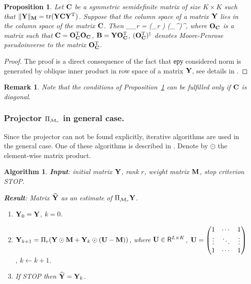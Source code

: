\documentclass[sii]{ipart}
\DeclareMathOperator{\tr}{tr}
\newtheorem{proposition}{Proposition}
\newtheorem{algorithm}{Algorithm}
\newtheorem{remark}{Remark}
\begin{document}
\begin{proposition}
	\label{prop:projS}
	Let $\mathbf{C}$ be a symmetric semidefinite matrix of size $K \times K$ such that $\|\bfY\|_\bfM = \tr(\bfY \bfC \bfY^\rmT)$.
	Suppose that the column space of a matrix $\mathbf{Y}$ lies in the column space of the matrix $\mathbf{C}$.
	Then
	\be
	\label{eq:PiMr}
	\Pi_{\calM_r} \bfY = (\Pi_r \bfB) (\bfO_\bfC^{\rmT})^\dagger,
	\ee
	where $\mathbf{O}_{\mathbf{C}}$ is a matrix such that $\mathbf{C} = \mathbf{O}_{\mathbf{C}}^{\mathrm{T}}\mathbf{O}_{\mathbf{C}}$,
	$\mathbf{B} = \mathbf{Y} \mathbf{O}_{\mathbf{C}}^{\mathrm{T}}$, $(\mathbf{O}_{\mathbf{C}}^{\mathrm{T}})^\dagger$ denotes  Moore-Penrose pseudoinverse to the matrix $\mathbf{O}_{\mathbf{C}}^{\mathrm{T}}$.
\end{proposition}
\begin{proof}
	The proof is a direct consequence of the fact that еру considered norm is generated by oblique inner product in row space of a matrix $\mathbf{Y}$, see details in \cite{Golyandina2013}.
\end{proof}

\begin{remark}
	Note that the conditions of Proposition~\ref{prop:projS} can be fulfilled only if $\mathbf{C}$ is diagonal.
\end{remark}

\subsubsection{Projector $\Pi_{\mathcal{M}_r}$ in general case.}
Since the projector can not be found explicitly, iterative algorithms are used in the general case.
One of these algorithms is described in \cite{Srebro2003}. Denote by $\odot$ the element-wise matrix product.

\begin{algorithm}
	\label{alg:weightedSVD}
	\textbf{Input}: initial matrix $\mathbf{Y}$, rank $r$, weight matrix $\mathbf{M}$,
	stop criterion STOP.
	
	\textbf{Result}:
	Matrix $\widehat{\mathbf{Y}}$ as an estimate of $\Pi_{\mathcal{M}_r} \mathbf{Y}$.
	
	\begin{enumerate}
		\item
		$\mathbf{Y}_0 = \mathbf{Y}$, $k=0$.
		\item
		$\mathbf{Y}_{k+1} = \Pi_r(\mathbf{Y} \odot \mathbf{M} + \mathbf{Y}_{k} \odot (\mathbf{U} -  \mathbf{M}))$, where
		$\mathbf{U} \in \mathsf{R}^{L \times K}$,  $\bfU = \begin{pmatrix}
		1 & \cdots & 1 \\
		\vdots & \ddots & \vdots \\
		1 & \cdots & 1
		\end{pmatrix}$, $k\leftarrow k+1$.
		\item
		If STOP then $\widehat{\mathbf{Y}} = \mathbf{Y}_k$.
	\end{enumerate}
\end{algorithm}
\end{document}
